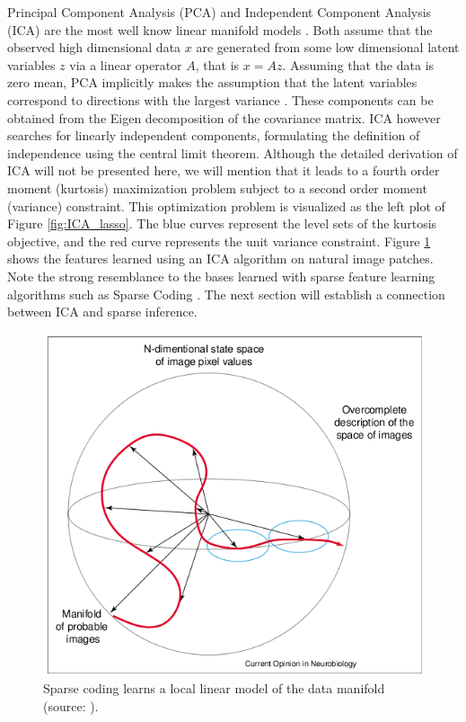 Principal Component Analysis (PCA) and Independent Component Analysis (ICA) are
the most well know linear manifold models \cite{ICA}. Both assume that the
observed high dimensional data $x$ are generated from some low dimensional
latent variables $z$ via a linear operator $A$, that is $x=Az$. Assuming that
the data is zero mean, PCA implicitly makes the assumption that the latent
variables correspond to directions with the largest variance \cite{PCA}.  These
components can be obtained from the Eigen decomposition of the covariance
matrix.  ICA however searches for linearly independent components, formulating
the definition of independence using the central limit theorem. Although the
detailed derivation of ICA will not be presented here, we will mention that it
leads to a fourth order moment (kurtosis) maximization problem subject to a
second order moment (variance) constraint. This optimization problem is
visualized as the left plot of Figure \ref{fig:ICA_lasso}. The blue curves
represent the level sets of the kurtosis objective, and the red curve
represents the unit variance constraint. Figure \ref{fig:ICA_features}  shows
the features learned using an ICA algorithm on natural image patches.  Note the
strong resemblance to the bases learned with sparse feature learning algorithms
such as Sparse Coding \cite{SC}. The next section will establish a
connection between ICA and sparse inference.  

\begin{figure} 
\centering
\includegraphics[scale=0.4]{./figures/related_work/imageManifold.png} 
\caption{Sparse coding learns a local linear model of the data manifold (source: \cite{SC2}).}
\label{fig:ICA_features} 
\end{figure} 

